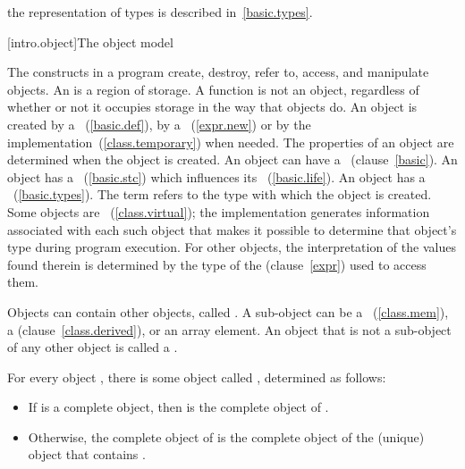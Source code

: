 \pnum
\enternote the representation of types is described
in~\ref{basic.types}. \exitnote


[intro.object]{The \Cpp object model}

\pnum
{}%
%
The constructs in a \Cpp program create, destroy, refer to, access, and
manipulate objects. An  is a region of storage.
\enternote A function is not an object, regardless of whether or not it
occupies storage in the way that objects do. \exitnote An object is
created by a ~(\ref{basic.def}), by a
~(\ref{expr.new}) or by the
implementation~(\ref{class.temporary}) when needed. The properties of an
object are determined when the object is created. An object can have a
~(clause~\ref{basic}). An object has a ~(\ref{basic.stc}) which influences its
~(\ref{basic.life}). An object has a
~(\ref{basic.types}). The term  refers to
the type with which the object is created.
Some objects are
~(\ref{class.virtual}); the implementation
generates information associated with each such object that makes it
possible to determine that object's type during program execution. For
other objects, the interpretation of the values found therein is
determined by the type of the  (clause~\ref{expr})
used to access them.

\pnum
{}%
Objects can contain other objects, called .
A sub-object can be
a ~(\ref{class.mem}), a 
(clause~\ref{class.derived}), or an array element.
%
An object that is not a sub-object of any other object is called a .

\pnum
For every object , there is some object called
 , determined as follows:

\begin{itemize}

\item
If  is a complete object, then  is the complete
object of .

\item
Otherwise, the complete object of  is the complete object
of the (unique) object that contains .

\end{itemize}

